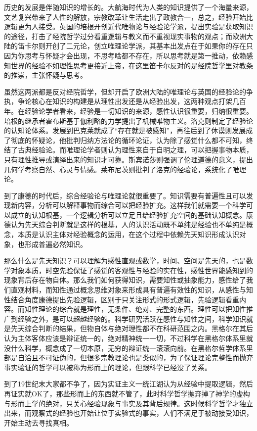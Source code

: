 \documentclass[]{tufte-book}
\begin{document}
历史的发展是伴随知识的增长的。大航海时代为人类的知识提供了一个海量来源，文艺复兴带来了人性的解放，宗教改革让生活走出了政教合一，总之，经验开始比逻辑更为人接受。英国的培根开创近代唯物论与经验论学派，提出实验是获取知识的途径，打击了经院哲学过分看重逻辑与教义而不重视现实事物的观点；而欧洲大陆的笛卡尔则开创了二元论，创立唯理论学派，其基本出发点在于如果你的存在只因为你思考与怀疑才会出现，不思考啥都不存在，所以思考就是第一推动，依赖感知世界的经验不如理性思考更接近上帝，在这里笛卡尔反对的是经院哲学里对教条的推崇，主张怀疑与思考。

虽然这两派都是反对经院哲学，但却开启了欧洲大陆的唯理论与英国的经验论的争执，争论核心在知识的构建是从理性出发还是从经验出发，这两种观点打架几百年。在经验论学者看来，经验是一切知识的来源，感性认识很重要，归纳很重要。培根的继承者霍布斯基于伽利略的力学提出了机械唯物主义。洛克则制定了经验论的认知论体系。发展到巴克莱就成了``存在就是被感知''，再往后到了休谟则发展成了彻底的怀疑论，他批判归纳方法论的循环论证，认为除了感觉什么都不可知，终结了古典经验论。而唯理论学者则认为理性来自于自明之理，可以把握事物本质，只有理性推导或演绎出来的知识才可靠。斯宾诺莎则强调了伦理道德的意义，提出几何学考察自然、心灵与情感。莱布尼茨则批判了洛克的经验论，系统化了唯理论。

到了康德的时代后，综合经验论与唯理论就很重要了。知识需要有普遍性且可以发现新内容，分析可以解释事物而综合可以把经验扩充。这样我们就需要一个科学可以成立的认知根基，一个逻辑分析可以立足且给经验扩充空间的基础认知概念。康德认为先天综合判断就是这样的根基，人的认识活动既不单纯是经验也不单纯是概念，本质是认识主体对经验概念的运用，在这个过程中依赖先天知识形成认识对象，也形成普遍必然知识。

那么什么是先天知识？可以理解为感性直观或数学，时间、空间是先天的，也是数学对象本质，时空先验保证了感觉的客观性与经验的实在性，感性世界能感知到的现象背后存在物自体。那么我们如何获得知识，需要知性或抽象能力，感性给了我们直观材料，而知性通过概念思维对象来形成具有普遍有效性的知识，从感性与知性结合角度康德提出先验逻辑，区别于只关注形式的形式逻辑，先验逻辑看重内容。而知性理论的综合就是理性，无条件、绝对、完整的东西。理性可以把知性推广到经验之外，是可以超越经验的。科学研究活跃在感性与知性之间，科学知识就是先天综合判断的结果，但物自体与绝对理性都不在科研范围之内。黑格尔在其后认为主体客体应该是辩证统一的，绝对精神统一一切，不过科学在黑格尔体系里就没什么科学，概念成了一切本原，无穷的辩证统一滚滚向前。在黑格尔哲学体系里部是自洽且不可证伪的，但很多宗教理论也是类似的，为了保证理论完整性而抛弃事实验证的哲学可以被称为形而上的理论，但跟科学已经没了关系。

到了19世纪末大家都不争了，因为实证主义一统江湖认为从经验中提取逻辑，然后再证实就OK了，那些形而上的东西就不管了，此时科学哲学抛弃掉了神学的虚构与形而上学的绝对，只关心经验现象与事实及其背后规律。这时候科学哲学才独立出来，而观察式的经验也开始让位于实验式的事实，人们不满足于被动接受知识，开始主动去寻找真相。
\end{document}
